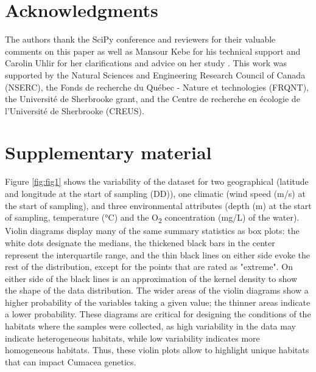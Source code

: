 \section{Acknowledgments}\label{acknowledgments}

The authors thank the SciPy conference and reviewers for their valuable comments on this paper as well as Mansour Kebe for his technical support and Carolin Uhlir for her clarifications and advice on her study \citep{uhlir_adding_2021}. This work was supported by the Natural Sciences and Engineering Research Council of Canada (NSERC), the Fonds de recherche du Québec - Nature et technologies (FRQNT), the Université de Sherbrooke grant, and the Centre de recherche en écologie de l’Université de Sherbrooke (CREUS).

\appendix


\section*{Supplementary material}\label{Supplementary material}

Figure \ref{fig:fig1} shows the variability of the dataset for two geographical (latitude and longitude at the start of sampling (DD)), one climatic (wind speed (m/s) at the start of sampling), and three environmental attributes (depth (m) at the start of sampling, temperature (°C) and the O\textsubscript{2}  concentration (mg/L) of the water). Violin diagrams display many of the same summary statistics as box plots: the white dots designate the medians, the thickened black bars in the center represent the interquartile range, and the thin black lines on either side evoke the rest of the distribution, except for the points that are rated as "extreme". On either side of the black lines is an approximation of the kernel density to show the shape of the data distribution. The wider areas of the violin diagrams show a higher probability of the variables taking a given value; the thinner areas indicate a lower probability. These diagrams are critical for designing the conditions of the habitats where the samples were collected, as high variability in the data may indicate heterogeneous habitats, while low variability indicates more homogeneous habitats. Thus, these violin plots allow to highlight unique habitats that can impact Cumacea genetics.

